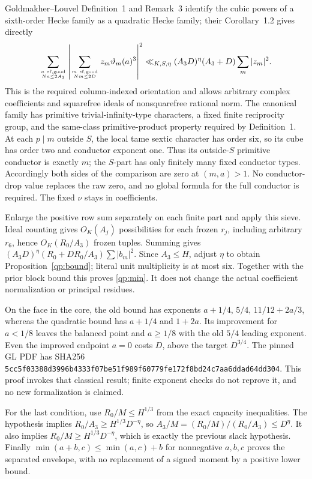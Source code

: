 \documentclass[11pt,oneside,openany]{book}
\theoremstyle{definition}\newtheorem{definition}[theorem]{Definition}
\theoremstyle{remark}\newtheorem{remark}[theorem]{Remark}
\begin{document}
Goldmakher--Louvel Definition~1 and Remark~3 identify the cubic powers
of a sixth-order Hecke family as a quadratic Hecke family; their
Corollary~1.2 gives directly
\[
 \sum_{a\ \mathrm{sf,good}\atop Na\le2A_3}
 \left|\sum_{m\ \mathrm{sf,good}\atop Nm\le2D}
                z_m\vartheta_m(a)^3\right|^2
 \ll_{K,S,\eta}(A_3D)^\eta(A_3+D)\sum_m|z_m|^2.
\]
This is the required column-indexed orientation and allows arbitrary
complex coefficients and squarefree ideals of nonsquarefree rational norm.
The canonical family has primitive trivial-infinity-type characters, a
fixed finite reciprocity group, and the same-class primitive-product
property required by Definition~1. At each $p\mid m$ outside $S$, the
local tame sextic character has order six, so its cube has order two and
conductor exponent one. Thus its outside-$S$ primitive conductor is
exactly $m$; the $S$-part has only finitely many fixed conductor types.
Accordingly both sides of the comparison are zero at $(m,a)>1$.
No conductor-drop value replaces the raw zero, and no global formula
for the full conductor is required. The fixed $\nu$ stays in coefficients.

Enlarge the positive row sum separately on each finite part and apply
this sieve. Ideal counting gives $O_K(A_j)$ possibilities for each frozen
$r_j$, including arbitrary $r_6$, hence $O_K(R_0/A_3)$ frozen tuples.
Summing gives $(A_3D)^\eta(R_0+DR_0/A_3)\sum|b_m|^2$.
Since $A_3\le H$, adjust $\eta$ to obtain
Proposition~\ref{qp:bound}; literal unit multiplicity is at most six.
Together with the prior block bound this proves
\eqref{qp:min}. It does not change the actual coefficient
normalization or principal residues.

On the face in the core, the old bound has exponents
$a+1/4$, $5/4$, $11/12+2a/3$, whereas the quadratic bound has
$a+1/4$ and $1+2a$. Its improvement for $a<1/8$ leaves the balanced
point and $a\ge1/8$ with the old $5/4$ leading exponent. Even the
improved endpoint $a=0$ costs $D$, above the target $D^{3/4}$.
The pinned GL PDF has SHA256
\texttt{5cc5f03388d3996b4333f07be51f989f}\allowbreak\texttt{60779fe172f8bd24c7aa6ddad64dd304}.
This proof invokes that classical result; finite exponent checks do not
reprove it, and no new formalization is claimed.

For the last condition, use $R_0/M\le H^{1/3}$ from the exact
capacity inequalities. The hypothesis implies
$R_0/A_3\ge H^{1/3}D^{-\eta}$, so
$A_3/M=(R_0/M)/(R_0/A_3)\le D^\eta$.
It also implies $R_0/M\ge H^{1/3}D^{-\eta}$, which is exactly
the previous slack hypothesis. Finally
$\min(a+b,c)\le\min(a,c)+b$ for nonnegative $a,b,c$
proves the separated envelope, with no replacement of a signed moment
by a positive lower bound.
\end{document}
